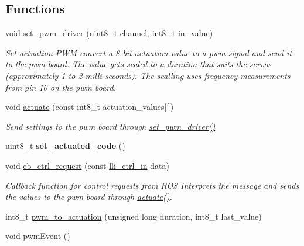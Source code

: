 \subsection*{Functions}
\begin{DoxyCompactItemize}
\item 
void \hyperlink{group__GlobalVariables_gadab070eb39b45b4c79b5d7e3cafa9514}{set\+\_\+pwm\+\_\+driver} (uint8\+\_\+t channel, int8\+\_\+t in\+\_\+value)
\begin{DoxyCompactList}\small\item\em Set actuation P\+WM convert a 8 bit actuation value to a pwm signal and send it to the pwm board. The value gets scaled to a duration that suits the servos (approximately 1 to 2 milli seconds). The scalling uses frequency measurements from pin 10 on the pwm board. \end{DoxyCompactList}\item 
void \hyperlink{group__GlobalVariables_gaa5545eb35f187e5fd11a483a265bed7b}{actuate} (const int8\+\_\+t actuation\+\_\+values\mbox{[}$\,$\mbox{]})
\begin{DoxyCompactList}\small\item\em Send settings to the pwm board through \hyperlink{group__Functions_gadab070eb39b45b4c79b5d7e3cafa9514}{set\+\_\+pwm\+\_\+driver()} \end{DoxyCompactList}\item 
uint8\+\_\+t {\bfseries set\+\_\+actuated\+\_\+code} ()\hypertarget{group__GlobalVariables_gad7d57085af575cbb5dc21e523f3a3321}{}\label{group__GlobalVariables_gad7d57085af575cbb5dc21e523f3a3321}

\item 
void \hyperlink{group__GlobalVariables_ga75bbdc12a150ad66dc004cb30bb5de4f}{cb\+\_\+ctrl\+\_\+request} (const \hyperlink{group__GlobalVariables_ga397644608f772ef60685f6a938f43ea1}{lli\+\_\+ctrl\+\_\+in} data)
\begin{DoxyCompactList}\small\item\em Callback function for control requests from R\+OS Interprets the message and sends the values to the pwm board through \hyperlink{group__Functions_gaa5545eb35f187e5fd11a483a265bed7b}{actuate()}. \end{DoxyCompactList}\item 
int8\+\_\+t \hyperlink{group__GlobalVariables_gaf4fdc44b265856b40c792260af0975f1}{pwm\+\_\+to\+\_\+actuation} (unsigned long duration, int8\+\_\+t last\+\_\+value)
\item 
void \hyperlink{group__GlobalVariables_ga2948125fe6592c36c5c0e641478e2db0}{pwm\+Event} ()\hypertarget{group__GlobalVariables_ga2948125fe6592c36c5c0e641478e2db0}{}\label{group__GlobalVariables_ga2948125fe6592c36c5c0e641478e2db0}


\end{DoxyCompactItemize}

